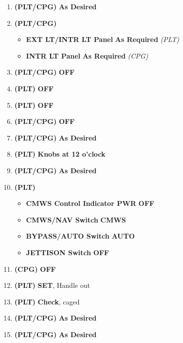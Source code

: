 \documentclass[fontHelvetica]{TechCheck}
\begin{document}
	\begin{enumerate}[leftmargin=0.1\linewidth,rightmargin=0.1\linewidth]
		\item {} \textbf{(PLT/CPG)} \dotfill \textbf{As Desired}
		\item {} \textbf{(PLT/CPG)} 
		\begin{itemize}
			\item \textbf{EXT LT/INTR LT Panel} \dotfill \textbf{As Required}
			\emph{(PLT)}
			\item \textbf{INTR LT Panel} \dotfill \textbf{As Required}
			\emph{(CPG)}
		\end{itemize}
		\item {} \textbf{(PLT/CPG)} \dotfill \textbf{OFF}
		\item {} \textbf{(PLT)} \dotfill \textbf{OFF}
		\item {} \textbf{(PLT)} \dotfill \textbf{OFF}
		\item {} \textbf{(PLT/CPG)} \dotfill \textbf{OFF}
		\item {} \textbf{(PLT/CPG)} \dotfill \textbf{As Desired}
		\item {} \textbf{(PLT)} \dotfill \textbf{Knobs at 12 o'clock}
		\item {} \textbf{(PLT/CPG)} \dotfill \textbf{As Desired}
		\item {} \textbf{(PLT)}
		\begin{itemize}
				\item \textbf{CMWS Control Indicator PWR} \dotfill \textbf{OFF}
				\item \textbf{CMWS/NAV Switch} \dotfill \textbf{CMWS}
				\item \textbf{BYPASS/AUTO Switch} \dotfill \textbf{AUTO}
				\item \textbf{JETTISON Switch} \dotfill \textbf{OFF}
		\end{itemize}
		\item {} \textbf{(CPG)} \dotfill \textbf{OFF}
		\item {} \textbf{(PLT)} \dotfill \textbf{SET}, Handle out
		\item {} \textbf{(PLT)} \dotfill \textbf{Check}, caged
		\item {} \textbf{(PLT/CPG)} \dotfill \textbf{As Desired}
		\item {} \textbf{(PLT/CPG)} \dotfill \textbf{As Desired} \\
	\end{enumerate}
\end{document}
